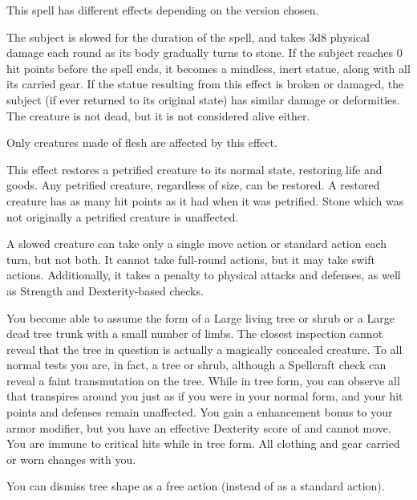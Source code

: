 \spellrng{\rngmed}
\begin{spelleffect}
  This spell has different effects depending on the version chosen.
  \par {} The subject is slowed for the duration of the spell, and takes 3d8 physical damage each round as its body gradually turns to stone. If the subject reaches 0 hit points before the spell ends, it becomes a mindless, inert statue, along with all its carried gear. If the statue resulting from this effect is broken or damaged, the subject (if ever returned to its original state) has similar damage or deformities. The creature is not dead, but it is not considered alive either.
  \par Only creatures made of flesh are affected by this effect.
  \par {} This effect restores a petrified creature to its normal state, restoring life and goods. Any petrified creature, regardless of size, can be restored. A restored creature has as many hit points as it had when it was petrified. Stone which was not originally a petrified creature is unaffected.
\end{spelleffect}
\begin{spellnotes}
A slowed creature can take only a single move action or standard action each turn, but not both. It cannot take full-round actions, but it may take swift actions. Additionally, it takes a  penalty to physical attacks and defenses, as well as Strength and Dexterity-based checks.
\end{spellnotes}

\begin{spelleffect}
  You become able to assume the form of a Large living tree or shrub or a Large dead tree trunk with a small number of limbs. The closest inspection cannot reveal that the tree in question is actually a magically concealed creature. To all normal tests you are, in fact, a tree or shrub, although a Spellcraft check can reveal a faint transmutation on the tree. While in tree form, you can observe all that transpires around you just as if you were in your normal form, and your hit points and defenses remain unaffected. You gain a  enhancement bonus to your armor modifier, but you have an effective Dexterity score of  and cannot move. You are immune to critical hits while in tree form. All clothing and gear carried or worn changes with you.
\end{spelleffect}
\begin{spellnotes}
  You can dismiss tree shape as a free action (instead of as a standard action).
\end{spellnotes}

